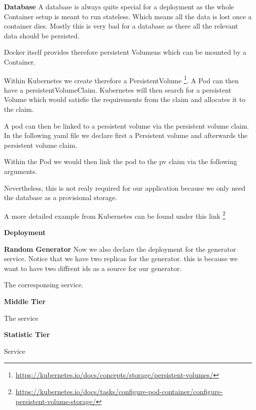 \textbf{Database}
A database is always quite special for a deployment as the whole Container setup is meant to run stateless. Which means all the data is lost once a container dies. Mostly this is very bad for a database as there all the relevant data should be persisted.

Docker itself provides therefore persistent Volumens which can be mounted by a Container.

Within Kubernetes we create therefore a PersistentVolume \footnote{\url{https://kubernetes.io/docs/concepts/storage/persistent-volumes/}}. A Pod can then have a persistentVolumeClaim. Kubernetes will then search for a persistent Volume which would satisfie the requirements from the claim and allocates it to the claim.

A pod can then be linked to a persistent volume via the persistent volume claim.
In the following yaml file we declare first a Persistent volume and afterwards the persistent volume claim.


Within the Pod we would then link the pod to the pv claim via the following arguments.

Nevertheless, this is not realy required for our application because we only need the database as a provisional storage.

A more detailed example from Kubernetes can be found under this link \footnote{\url{https://kubernetes.io/docs/tasks/configure-pod-container/configure-persistent-volume-storage/}}

\textbf{Deployment}





\textbf{Random Generator}
Now we also declare the deployment for the generator service.
Notice that we have two replicas for the generator. this is because we want to have two diffrent ids as a source for our generator.


The corresponsing service.


\textbf{Middle Tier}

The service


\textbf{Statistic Tier}

Service


